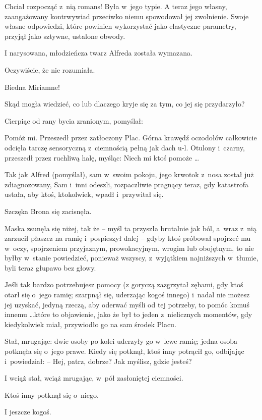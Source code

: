 \documentclass[oneside,polish,11pt,rmheadings]{mwbk}
\begin{document}
Chciał rozpocząć z~nią romans! Była w~jego typie. A teraz jego własny, zaangażowany kontrwywiad przeciwko niemu spowodował jej zwolnienie. Swoje własne odpowiedzi, które powinien wykorzystać jako elastyczne parametry, przyjął jako sztywne, ustalone obwody. 

I narysowana, młodzieńcza twarz Alfreda została wymazana. 

Oczywiście, że nie rozumiała. 

Biedna Miriamne! 

Skąd mogła wiedzieć, co lub dlaczego kryje się za tym, co jej się przydarzyło? 

Cierpiąc od rany bycia zranionym, pomyślał: 

Pomóż mi. Przeszedł przez zatłoczony Plac. Górna krawędź oczodołów całkowicie odcięła tarczę sensoryczną z~ciemnością pełną jak dach u-l. Otulony i~czarny, przeszedł przez ruchliwą halę, myśląc: Niech mi ktoś pomoże \ldots  

Tak jak Alfred (pomyślał), sam w~swoim pokoju, jego krwotok z~nosa został już zdiagnozowany, Sam i~inni odeszli, rozpaczliwie pragnący teraz, gdy katastrofa ustała, aby ktoś, ktokolwiek, wpadł i~przywitał się. 

Szczęka Brona się zacisnęła. 

Maska zsunęła się niżej, tak że -- myśl ta przyszła brutalnie jak ból, a~wraz z~nią zarzucił płaszcz na ramię i~pospieszył dalej -- gdyby ktoś próbował spojrzeć mu w~oczy, spojrzeniem przyjaznym, prowokacyjnym, wrogim lub obojętnym, to nie byłby w~stanie powiedzieć, ponieważ wszyscy, z~wyjątkiem najniższych w~tłumie, byli teraz głupawo bez głowy. 

Jeśli tak bardzo potrzebujesz pomocy (z goryczą zazgrzytał zębami, gdy ktoś otarł się o~jego ramię; szarpnął się, uderzając kogoś innego) i~nadal nie możesz jej uzyskać, jedyną rzeczą, aby oderwać myśli od tej potrzeby, to pomóc komuś innemu \ldots  które to objawienie, jako że był to jeden z~nielicznych momentów, gdy kiedykolwiek miał, przywiodło go na sam środek Placu. 

Stał, mrugając: dwie osoby po kolei uderzyły go w~lewe ramię; jedna osoba potknęła się o~jego prawe. Kiedy się potknął, ktoś inny potrącił go, odbijając i~powiedział:  -- Hej, patrz, dobrze? Jak myślisz, gdzie jesteś? 

I wciąż stał, wciąż mrugając, w~pół zasłoniętej ciemności. 

Ktoś inny potknął się o~niego. 

I jeszcze kogoś. 
\end{document}
